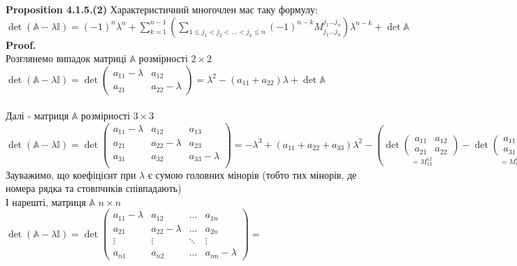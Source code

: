 \documentclass[a4paper, 14pt]{extarticle}
\def\huge{\displaystyle}
\def\prp#1{\textbf{Proposition {#1}}}
\def\proof{\textbf{Proof.}\\}
\def\bigline{\vspace{5mm}\\}
\begin{document}
\prp{4.1.5.(2)} Характеристичний многочлен має таку формулу: \\ $\det(\mathbb{A} - \lambda \mathbb{I}) = \huge (-1)^n \lambda^n + \sum_{k=1}^{n-1} \left( \sum_{1 \leq j_1 < j_2 < \dots < j_k \leq n} (-1)^{n-k} M_{j_1 \dots j_n}^{j_1 \dots j_n} \right) \lambda^{n-k} + \det \mathbb{A}$\\
\proof
Розглянемо випадок матриці $\mathbb{A}$ розмірності $2 \times 2$\\
$\det (\mathbb{A} - \lambda \mathbb{I}) = \det \begin{pmatrix}
a_{11}-\lambda & a_{12} \\
a_{21} & a_{22} - \lambda
\end{pmatrix} = \lambda^2 - (a_{11}+a_{22})\lambda + \det \mathbb{A}$\\
\\
Далі - матриця $\mathbb{A}$ розмірності $3 \times 3$\\
$\det (\mathbb{A} - \lambda \mathbb{I}) = \det \begin{pmatrix}
a_{11}-\lambda & a_{12} & a_{13} \\
a_{21} & a_{22}-\lambda & a_{23} \\
a_{31} & a_{32} & a_{33}-\lambda \\
\end{pmatrix} = -\lambda^3 + (a_{11}+a_{22}+a_{33})\lambda^2 - \left(\underset{=M_{12}^{12}}{\det \begin{pmatrix}
a_{11} & a_{12} \\
a_{21} & a_{22}
\end{pmatrix}} - \underset{=M_{13}^{13}}{\det \begin{pmatrix}
a_{11} & a_{13} \\
a_{31} & a_{33}
\end{pmatrix}} + \underset{=M_{23}^{23}}{\det \begin{pmatrix}
a_{22} & a_{23} \\
a_{32} & a_{33}
\end{pmatrix}} \right)\lambda + \det \mathbb{A}$\\
Зауважимо, що коефіцієнт при $\lambda$ є сумою головних мінорів (тобто тих мінорів, де номера рядка та стовпчиків співпадають)
\bigline
І нарешті, матриця $\mathbb{A}$ $n \times n$\\
$\det (\mathbb{A} - \lambda \mathbb{I}) = \det \begin{pmatrix}
a_{11}-\lambda & a_{12} & \dots & a_{1n} \\
a_{21} & a_{22} - \lambda & \dots & a_{2n} \\
\vdots & \vdots & \ddots & \vdots \\
a_{n1} & a_{n2} & \dots & a_{nn}-\lambda
\end{pmatrix} = $\\
\end{document}
